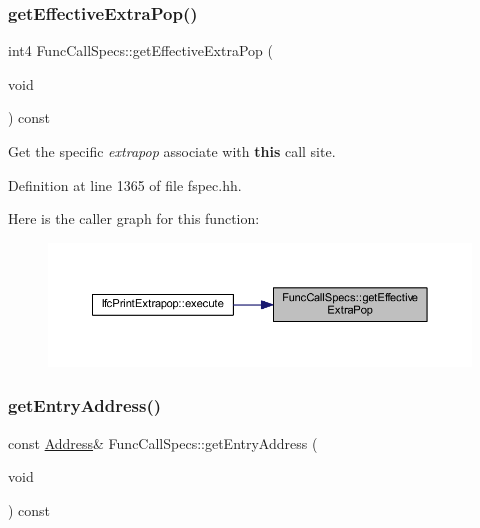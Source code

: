 \subsubsection{\texorpdfstring{getEffectiveExtraPop()}{getEffectiveExtraPop()}}
{\footnotesize\ttfamily int4 Func\+Call\+Specs\+::get\+Effective\+Extra\+Pop (\begin{DoxyParamCaption}\item[{void}]{ }\end{DoxyParamCaption}) const\hspace{0.3cm}{\ttfamily [inline]}}



Get the specific {\itshape extrapop} associate with {\bfseries{this}} call site. 



Definition at line 1365 of file fspec.\+hh.

Here is the caller graph for this function\+:
\nopagebreak
\begin{figure}[H]
\begin{center}
\leavevmode
\includegraphics[width=350pt]{class_func_call_specs_ade3352e35ffd4ed59bbc78f4b43c2998_icgraph}
\end{center}
\end{figure}
\mbox{\label{class_func_call_specs_a0a5d18be6037559397af11e6764abbcd}} 
\subsubsection{\texorpdfstring{getEntryAddress()}{getEntryAddress()}}
{\footnotesize\ttfamily const \mbox{\hyperlink{class_address}{Address}}\& Func\+Call\+Specs\+::get\+Entry\+Address (\begin{DoxyParamCaption}\item[{void}]{ }\end{DoxyParamCaption}) const\hspace{0.3cm}{\ttfamily [inline]}}




